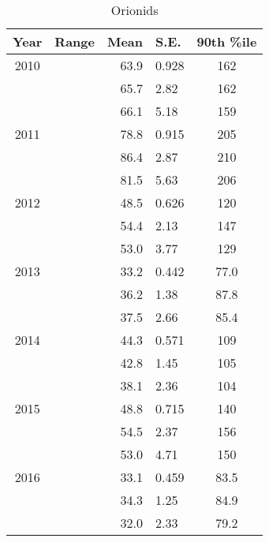 \documentclass[a4paper,12pt,twocolumn]{report}
\begin{document}
\begin{appendices}
\begin{table*}
	\centering
	\begin{tabular}{|c|c|r@{ \,$\pm$\, }l|c|}
		\hline 
		Year & Range & Mean & S.E. & 90th \%ile\\ 
		\hline 
		2010 & & 63.9 & 0.928 & 162   \\ 
		\hline 
		& &	65.7 & 2.82 & 162   \\ 
		\hline 
		& & 66.1 & 5.18 & 159   \\ 
		\hline 
		2011 & & 78.8 & 0.915 & 205   \\ 
		\hline 
		& & 86.4 & 2.87 & 210   \\ 
		\hline 
		& & 81.5 & 5.63 & 206   \\ 
		\hline 
		2012 & & 48.5 & 0.626 & 120   \\ 
		\hline 
		& & 54.4 & 2.13 & 147   \\ 
		\hline 
		& & 53.0 & 3.77 & 129   \\ 
		\hline 
		2013 & & 33.2 & 0.442 & 77.0   \\ 
		\hline 
		& & 36.2 & 1.38 & 87.8   \\ 
		\hline 
		& & 37.5 & 2.66 & 85.4   \\ 
		\hline 
		2014 & & 44.3 & 0.571 & 109   \\ 
		\hline 
		& & 42.8 & 1.45 & 105   \\ 
		\hline 
		& & 38.1 & 2.36 & 104  \\ 
		\hline 
		2015 & & 48.8 & 0.715 & 140   \\ 
		\hline 
		& & 54.5 & 2.37 & 156   \\ 
		\hline 
		& & 53.0 & 4.71 & 150   \\ 
		\hline
		2016 & & 33.1 & 0.459 & 83.5	\\
		\hline 
		& & 34.3 & 1.25 & 84.9   \\ 
		\hline 
		& & 32.0 & 2.33 & 79.2   \\ 
		\hline 
	\end{tabular}
	\caption{Orionids} 
\end{table*}


\end{appendices}
\end{document}
